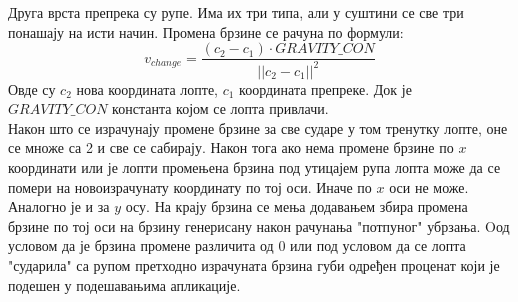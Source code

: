 Друга врста препрека су рупе.
Има их три типа, али у суштини се све три понашају на исти начин.
Промена брзине се рачуна по формули:
$$v_{change} =  \frac{(c_2 - c_1) \cdot GRAVITY\_CON}{|| c_2-c_1||^2}$$
Овде су $c_2$ нова координата лопте, $c_1$ координата препреке. Док је $GRAVITY\_CON$ константа којом се лопта привлачи.
\\ \indent
Након што се израчунају промене брзине за све сударе у том тренутку лопте, оне се множе са 2 и све се сабирају. Након тога ако нема промене брзине по $x$ координати или је лопти промењена брзина под утицајем рупа лопта може да се помери на новоизрачунату координату по тој оси. Иначе по $x$ оси не може. Аналогно је и за $y$ осу. На крају брзина се мења додавањем збира промена брзине по тој оси на брзину генерисану након рачунања "потпуног" убрзања. Oод условом да је брзина промене различита од 0 или под условом да се лопта "сударила" са рупом претходно израчуната брзина губи одређен проценат који је подешен у подешавањима апликације.


